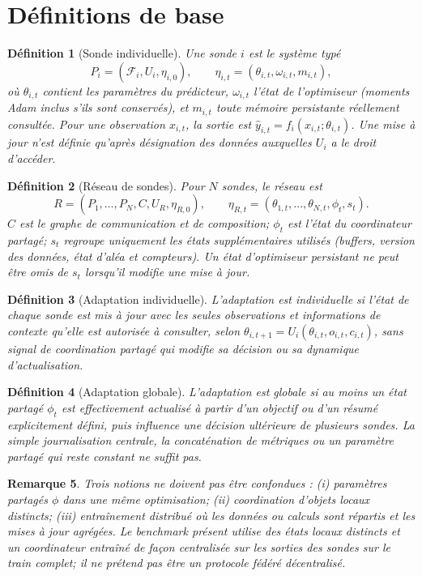 \documentclass[11pt,a4paper]{article}
\newtheorem{definition}{Définition}[section]
\newtheorem{remark}[definition]{Remarque}
\begin{document}
\section{Définitions de base}
\begin{definition}[Sonde individuelle]
Une sonde $i$ est le système typé
\[
P_i=(\mathcal F_i,U_i,\eta_{i,0}),\qquad
\eta_{i,t}=(\theta_{i,t},\omega_{i,t},m_{i,t}),
\]
où $\theta_{i,t}$ contient les paramètres du prédicteur, $\omega_{i,t}$ l'état de l'optimiseur (moments Adam inclus s'ils sont conservés), et $m_{i,t}$ toute mémoire persistante réellement consultée. Pour une observation $x_{i,t}$, la sortie est $\hat y_{i,t}=f_i(x_{i,t};\theta_{i,t})$. Une mise à jour n'est définie qu'après désignation des données auxquelles $U_i$ a le droit d'accéder.
\end{definition}
\begin{definition}[Réseau de sondes]
Pour $N$ sondes, le réseau est
\[
R=(P_1,\ldots,P_N,C,U_R,\eta_{R,0}),\qquad
\eta_{R,t}=(\theta_{1,t},\ldots,\theta_{N,t},\phi_t,s_t).
\]
$C$ est le graphe de communication et de composition; $\phi_t$ est l'état du coordinateur partagé; $s_t$ regroupe uniquement les états supplémentaires utilisés (buffers, version des données, état d'aléa et compteurs). Un état d'optimiseur persistant ne peut être omis de $s_t$ lorsqu'il modifie une mise à jour.
\end{definition}
\begin{definition}[Adaptation individuelle]
L'adaptation est individuelle si l'état de chaque sonde est mis à jour avec les seules observations et informations de contexte qu'elle est autorisée à consulter, selon $\theta_{i,t+1}=U_i(\theta_{i,t},o_{i,t},c_{i,t})$, sans signal de coordination partagé qui modifie sa décision ou sa dynamique d'actualisation.
\end{definition}
\begin{definition}[Adaptation globale]
L'adaptation est globale si au moins un état partagé $\phi_t$ est effectivement actualisé à partir d'un objectif ou d'un résumé explicitement défini, puis influence une décision ultérieure de plusieurs sondes. La simple journalisation centrale, la concaténation de métriques ou un paramètre partagé qui reste constant ne suffit pas.
\end{definition}
\begin{remark}
Trois notions ne doivent pas être confondues : (i) paramètres partagés $\phi$ dans une même optimisation; (ii) coordination d'objets locaux distincts; (iii) entraînement distribué où les données ou calculs sont répartis et les mises à jour agrégées. Le benchmark présent utilise des états locaux distincts et un coordinateur entraîné de façon centralisée sur les sorties des sondes sur le train complet; il ne prétend pas être un protocole fédéré décentralisé.
\end{remark}
\end{document}
